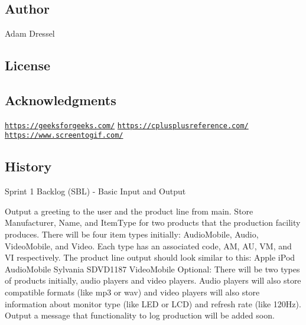 \subsection*{Author}

Adam Dressel

\subsection*{License}



\subsection*{Acknowledgments}

\href{https://geeksforgeeks.com/}{\tt https\+://geeksforgeeks.\+com/} \href{https://cplusplusreference.com/}{\tt https\+://cplusplusreference.\+com/} \href{https://www.screentogif.com/}{\tt https\+://www.\+screentogif.\+com/} \subsection*{History}

Sprint 1 Backlog (S\+BL) -\/ Basic Input and Output \begin{DoxyVerb}Output a greeting to the user and the product line from main.
    Store Manufacturer, Name, and ItemType for two products that the production facility produces. There will be four item types initially: AudioMobile, Audio, VideoMobile, and Video. Each type has an associated code, AM, AU, VM, and VI respectively. The product line output should look similar to this:
        Apple iPod AudioMobile
        Sylvania SDVD1187 VideoMobile
    Optional: There will be two types of products initially, audio players and video players. Audio players will also store compatible formats (like mp3 or wav) and video players will also store information about monitor type (like LED or LCD) and refresh rate (like 120Hz).
Output a message that functionality to log production will be added soon. 
\end{DoxyVerb}


